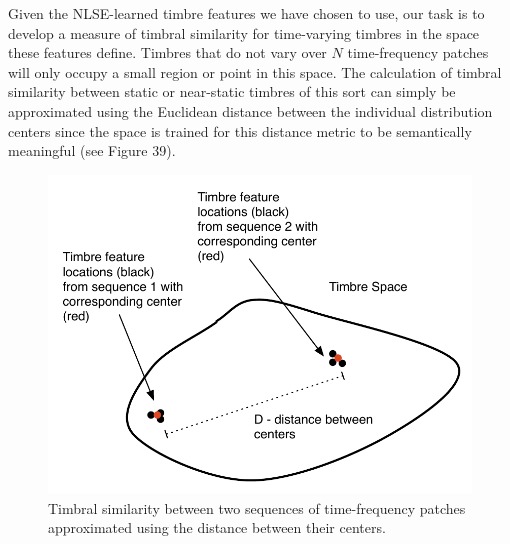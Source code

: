 \documentclass[12pt]{report} 	%
\numberwithin{figure}{chapter}
\numberwithin{table}{chapter}
\numberwithin{equation}{chapter}
\begin{document}
\begin{flushleft}
Given the NLSE-learned timbre features we have chosen to use, our task is to develop a measure of timbral similarity for time-varying timbres in the space these features define. Timbres that do not vary over $N$ time-frequency patches will only occupy a small region or point in this space. The calculation of timbral similarity between static or near-static timbres of this sort can simply be approximated using the Euclidean distance between the individual distribution centers since the space is trained for this distance metric to be semantically meaningful (see Figure 39). 
\begin{figure}[h!]
\vspace{24pt}
\begin{center}
\includegraphics[scale=0.8]{TimbreDistance1}
\caption[Timbre distance between centers]{Timbral similarity between two sequences of time-frequency patches approximated using the distance between their centers.}
\end{center}
\vspace{6pt}
\end{figure}


\end{flushleft}
\end{document}
